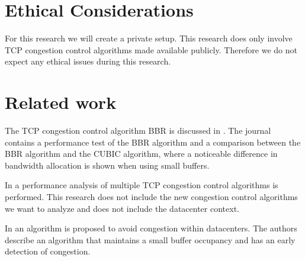 \documentclass{article}
\begin{document}
\section{Ethical Considerations}

For this research we will create a private setup. This research does only
involve TCP congestion control algorithms made available publicly. Therefore we
do not expect any ethical issues during this research.


\section{Related work}

The TCP congestion control algorithm BBR is discussed in \cite{bbr-congestion}.
The journal contains a performance test of the BBR algorithm and a comparison
between the BBR algorithm and the CUBIC algorithm, where a noticeable
difference in bandwidth allocation is shown when using small buffers.

In \cite{multiple-congestion} a performance analysis of multiple TCP congestion
control algorithms is performed. This research does not include the new
congestion control algorithms we want to analyze and does not include the
datacenter context.

In \cite{dctcp-congestion-original} an algorithm is proposed to avoid
congestion within datacenters. The authors describe an algorithm that maintains
a small buffer occupancy and has an early detection of congestion.

\printbibliography
\end{document}
